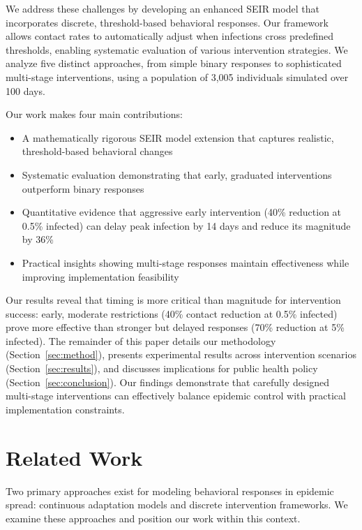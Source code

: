 \documentclass{article} %
\begin{document}
We address these challenges by developing an enhanced SEIR model that incorporates discrete, threshold-based behavioral responses. Our framework allows contact rates to automatically adjust when infections cross predefined thresholds, enabling systematic evaluation of various intervention strategies. We analyze five distinct approaches, from simple binary responses to sophisticated multi-stage interventions, using a population of 3,005 individuals simulated over 100 days.

Our work makes four main contributions:
\begin{itemize}
    \item A mathematically rigorous SEIR model extension that captures realistic, threshold-based behavioral changes
    \item Systematic evaluation demonstrating that early, graduated interventions outperform binary responses
    \item Quantitative evidence that aggressive early intervention (40\% reduction at 0.5\% infected) can delay peak infection by 14 days and reduce its magnitude by 36\%
    \item Practical insights showing multi-stage responses maintain effectiveness while improving implementation feasibility
\end{itemize}

Our results reveal that timing is more critical than magnitude for intervention success: early, moderate restrictions (40\% contact reduction at 0.5\% infected) prove more effective than stronger but delayed responses (70\% reduction at 5\% infected). The remainder of this paper details our methodology (Section~\ref{sec:method}), presents experimental results across intervention scenarios (Section~\ref{sec:results}), and discusses implications for public health policy (Section~\ref{sec:conclusion}). Our findings demonstrate that carefully designed multi-stage interventions can effectively balance epidemic control with practical implementation constraints.

\section{Related Work}
\label{sec:related}

Two primary approaches exist for modeling behavioral responses in epidemic spread: continuous adaptation models and discrete intervention frameworks. We examine these approaches and position our work within this context.
\end{document}
